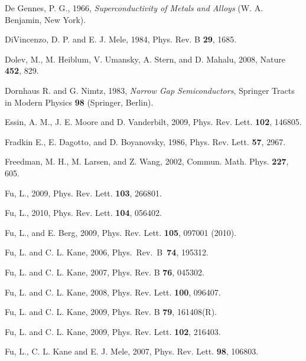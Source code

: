\documentclass[twocolumn,floatfix,showpacs,rmp,aps]{revtex4}
\begin{document}
\begin{thebibliography}{99}
		De Gennes, P. G., 1966,
		{\it Superconductivity of Metals and Alloys} (W. A. Benjamin, New York).
		
		DiVincenzo, D. P. and E. J. Mele, 1984,
		Phys. Rev. B {\bf 29}, 1685.
		
		Dolev, M., M. Heiblum, V. Umansky, A. Stern, and D. Mahalu, 2008,
		Nature {\bf 452}, 829.
		
		Dornhaus R. and G. Nimtz, 1983,
		{\it Narrow Gap Semiconductors},
		Springer Tracts in Modern Physics {\bf 98} (Springer, Berlin).
		
		Essin, A. M., J. E. Moore and D. Vanderbilt, 2009,
		Phys. Rev. Lett. {\bf 102}, 146805.
		
		Fradkin E., E. Dagotto, and D. Boyanovsky, 1986, Phys. Rev.
		Lett. {\bf 57}, 2967.
		
		Freedman, M. H., M. Larsen, and Z. Wang, 2002,
		Commun. Math. Phys. {\bf 227}, 605.
		
		Fu, L., 2009,
		Phys. Rev. Lett. {\bf 103}, 266801.
		
		Fu, L., 2010,
		Phys. Rev. Lett. {\bf 104}, 056402.
		
		Fu, L., and E. Berg, 2009,
		Phys. Rev. Lett. {\bf 105}, 097001 (2010).
		
		Fu, L. and C. L. Kane, 2006,
		Phys.\ Rev.\ B\ {\bf 74}, 195312.
		
		Fu, L. and C. L. Kane, 2007,
		Phys. Rev. B {\bf 76}, 045302.
		
		Fu, L. and C. L. Kane, 2008,
		Phys. Rev. Lett. {\bf 100}, 096407.
		
		Fu, L. and C. L. Kane, 2009,
		Phys. Rev. B {\bf 79}, 161408(R).
		
		Fu, L. and C. L. Kane, 2009,
		Phys. Rev. Lett. {\bf 102}, 216403.
		
		Fu, L., C. L. Kane and E. J. Mele, 2007,
		Phys. Rev. Lett. {\bf 98}, 106803.
		

\end{thebibliography}
\end{document}

